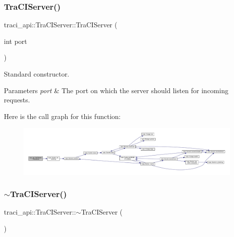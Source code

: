 \subsubsection{\texorpdfstring{Tra\+C\+I\+Server()}{TraCIServer()}}
{\footnotesize\ttfamily traci\+\_\+api\+::\+Tra\+C\+I\+Server\+::\+Tra\+C\+I\+Server (\begin{DoxyParamCaption}\item[{int}]{port }\end{DoxyParamCaption})}



Standard constructor. 


\begin{DoxyParams}{Parameters}
{\em port} & The port on which the server should listen for incoming requests. \\
\hline
\end{DoxyParams}
Here is the call graph for this function\+:
\nopagebreak
\begin{figure}[H]
\begin{center}
\leavevmode
\includegraphics[width=350pt]{classtraci__api_1_1_tra_c_i_server_a9960233a10a2c3790c375f91eec00b12_cgraph}
\end{center}
\end{figure}
\mbox{\label{classtraci__api_1_1_tra_c_i_server_a8ddc7d9ea6812c937cdaa06a00026eba}} 
\subsubsection{\texorpdfstring{$\sim$\+Tra\+C\+I\+Server()}{~TraCIServer()}}
{\footnotesize\ttfamily traci\+\_\+api\+::\+Tra\+C\+I\+Server\+::$\sim$\+Tra\+C\+I\+Server (\begin{DoxyParamCaption}{ }\end{DoxyParamCaption})}



